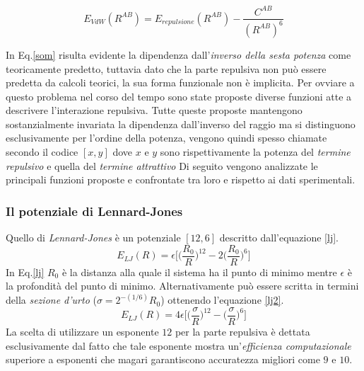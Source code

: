 \documentclass[oneside]{amsbook}
\numberwithin{section}{chapter}
\numberwithin{equation}{section}
\numberwithin{figure}{section}
\begin{document}
\begin{equation}
\label{som}
E_{VdW}(R^{AB})=E_{repulsione}(R^{AB})-\frac{C^{AB}}{(R^{AB})^6}
\end{equation}

In Eq.\ref{som} risulta evidente la dipendenza dall'\emph{inverso della sesta potenza} come teoricamente predetto, tuttavia dato che la parte repulsiva non può essere predetta da calcoli teorici, la sua forma funzionale non è implicita.
Per ovviare a questo problema nel corso del tempo sono state proposte diverse funzioni atte a descrivere l'interazione repulsiva. Tutte queste proposte mantengono sostanzialmente invariata la dipendenza dall'inverso del raggio ma si distinguono esclusivamente per l'ordine della potenza, vengono quindi spesso chiamate secondo il codice $[x,y]$ dove $x$ e $y$ sono rispettivamente la potenza del \emph{termine repulsivo} e quella del \emph{termine attrattivo} Di seguito vengono analizzate le principali funzioni proposte e confrontate tra loro e rispetto ai dati sperimentali.\\


\subsubsection{Il potenziale di Lennard-Jones}
Quello di \emph{Lennard-Jones} è un potenziale $[12,6]$ descritto dall'equazione \ref{lj}.
\begin{equation}
\label{lj}
E_{LJ}(R)=\epsilon \biggr[ \biggr( \frac{R_0}{R} \biggr)^{12} -2 \biggr( \frac{R_0}{R}  \biggr)^{6}  \biggr]
\end{equation}
In Eq.\ref{lj} $R_0$ è  la distanza alla quale il sistema ha il punto di minimo mentre $\epsilon$ è la profondità del punto di minimo.
Alternativamente può essere scritta in termini della \emph{sezione d'urto} ($\sigma = 2^{-(1/6)}R_0 $) ottenendo l'equazione \ref{lj2}.
\begin{equation}
\label{lj2}
E_{LJ}(R)=4 \epsilon \biggr[ \biggr( \frac{\sigma}{R} \biggr)^{12} - \biggr( \frac{\sigma}{R}  \biggr)^{6}  \biggr]
\end{equation}
La scelta di utilizzare un esponente $12$ per la parte repulsiva è dettata esclusivamente dal fatto che tale esponente mostra un'\emph{efficienza computazionale} superiore a esponenti che magari garantiscono accuratezza migliori come $9$ e $10$.\\
\end{document}
